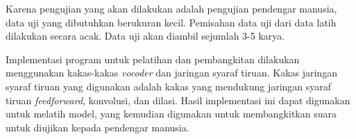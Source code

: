 Karena pengujian yang akan dilakukan adalah pengujian pendengar manusia, data uji yang dibutuhkan berukuran kecil. Pemisahan data uji dari data latih dilakukan secara acak. Data uji akan diambil sejumlah 3-5 karya.

Implementasi program untuk pelatihan dan pembangkitan dilakukan menggunakan kakas-kakas \textit{vocoder} dan jaringan syaraf tiruan. Kakas jaringan syaraf tiruan yang digunakan adalah kakas yang mendukung jaringan syaraf tiruan \textit{feedforward}, konvolusi, dan dilasi. Hasil implementasi ini dapat digunakan untuk melatih model, yang kemudian digunakan untuk membangkitkan suara untuk diujikan kepada pendengar manusia.